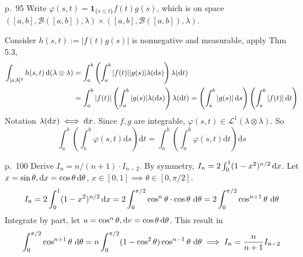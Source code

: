 \begin{note}{p.~95}
    Write $\varphi(s,t)=\mathbf{1}_{\{s\le t\}}f(t)g(s)$, which is on space $([a,b],\mathcal{B}([a,b]),\lambda)\times ([a,b],\mathcal{B}([a,b]),\lambda)$. 
    
    Consider $h(s,t):=|f(t)g(s)|$ is nonnegative and measurable, apply Thm 5.3, 
    \[
    \begin{aligned}
        \int_{[a,b]^2}h(s,t)\mathop{}\!\mathrm{d} (\lambda\otimes\lambda)
    &=\int_{a}^{b}\left(\int_{a}^{b}|f(t)||g(s)| \lambda(\mathop{}\!\mathrm{d} s)\right) \lambda(\mathop{}\!\mathrm{d} t)\\
     &=\int_{a}^{b}|f(t)|\left(\int_{a}^{b}|g(s)| \lambda(\mathop{}\!\mathrm{d} s)\right) \lambda(\mathop{}\!\mathrm{d} t)
      =\left(\int_{a}^{b}|g(s)| \mathop{}\!\mathrm{d} s\right)\left(\int_{a}^{b}|f(t)| \mathop{}\!\mathrm{d} t\right)
    \end{aligned}
    \]
    Notation $\lambda(\mathop{}\!\mathrm{d} x)\iff \mathop{}\!\mathrm{d} x$. Since $f,g$ are integrable, $\varphi(s,t)\in\mathcal{L}^1(\lambda\otimes\lambda)$. So
    \[
    \int_{a}^{b}\left(\int_{a}^{b} \varphi(s,t) \mathrm{d} s\right) \mathrm{d} t=\int_{a}^{b}\left(\int_{a}^{b} \varphi(s,t) \mathrm{d} t\right) \mathrm{d} s
    \]
\end{note}

\begin{note}{p.~100}
    Derive $I_n=n/(n+1)\cdot I_{n-2}$. By symmetry, $I_n=2\int_0^1 (1-x^2)^{n/2}\mathop{}\!\mathrm{d} x$. Let $x=\sin\theta,\mathop{}\!\mathrm{d} x=\cos\theta\mathop{}\!\mathrm{d}\theta$, $x\in [0,1]\implies \theta\in[0,\pi/2]$.
    \[
    I_n = 2 \int_0^1 (1 - x^2)^{n/2} \mathop{}\!\mathrm{d} x = 2 \int_0^{\pi/2} \cos^n \theta \cdot \cos \theta \, \mathop{}\!\mathrm{d}\theta = 2 \int_0^{\pi/2} \cos^{n+1} \theta \, \mathop{}\!\mathrm{d}\theta
    \]
    Integrate by part, let $u=\cos^n\theta,\mathop{}\!\mathrm{d} v=\cos\theta\mathop{}\!\mathrm{d} \theta$. This result in
    \[
    \int_0^{\pi/2} \cos^{n+1} \theta \, \mathop{}\!\mathrm{d}\theta=n\int_0^{\pi/2} (1-\cos^2\theta)\cos^{n - 1} \theta \, \mathop{}\!\mathrm{d}\theta\implies I_n=\frac{n}{n+1}I_{n-2}
    \]
\end{note}
